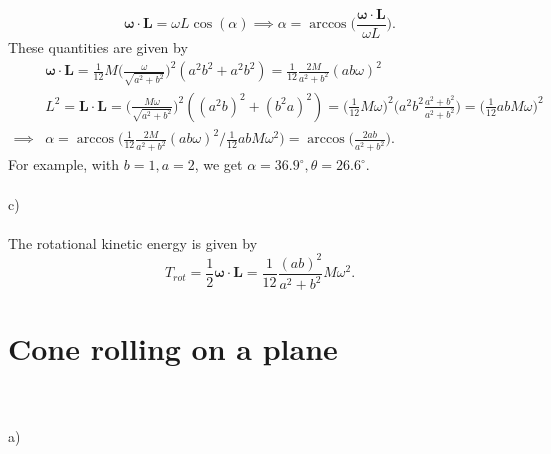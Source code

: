 \documentclass{article}
\begin{document}
    \begin{equation*}
        \boldsymbol \omega \cdot \mathbf{L} = \omega L \cos(\alpha) \implies \alpha = \arccos\bigg( \frac{\boldsymbol \omega \cdot \mathbf{L}}{\omega L}\bigg).
    \end{equation*}
    These quantities are given by
    \begin{align*}
        &\boldsymbol \omega \cdot \mathbf{L}  = \frac{1}{12} M \bigg( \frac{\omega}{\sqrt{a^2 + b^2}}\bigg)^2 (a^2b^2 + a^2b^2) = \frac{1}{12}\frac{2M}{a^2+ b^2} ( ab\omega)^2 \\
        &L^2 = \mathbf{L} \cdot \mathbf{L} = \bigg(\frac{M \omega}{\sqrt{a^2 + b^2}}\bigg)^2 ((a^2b)^2 + (b^2a)^2) = \bigg( \frac{1}{12}M \omega\bigg)^2 \bigg( a^2b^2\frac{a^2 + b^2}{a^2 + b^2}\bigg) = \bigg( \frac{1}{12} abM\omega \bigg)^2 \\
    \implies & \alpha = \arccos \bigg( 
        \frac{1}{12}\frac{2M}{a^2+ b^2} ( ab\omega)^2 \bigg/ \frac{1}{12} abM\omega^2 \bigg)
        = \arccos\bigg(\frac{2ab}{a^2 + b^2}\bigg).
    \end{align*}
    For example, with $b=1, a=2$, we get $\alpha = 36.9^\circ, \theta = 26.6^\circ$.
    \\ \\
    c) 
    \\ \\
    The rotational kinetic energy is given by 
    \begin{equation*}
        T_{rot} = \frac{1}{2} \boldsymbol \omega \cdot \mathbf{L} = \frac{1}{12}\frac{( ab)^2}{a^2+ b^2} M \omega^2.
    \end{equation*}

    \section{Cone rolling on a plane}
    \\ \\
    a)
    \\ \\
    
    
\end{document}
